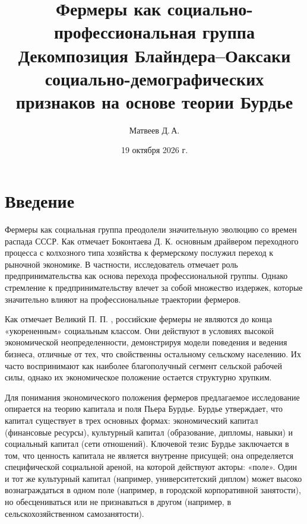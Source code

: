 \documentclass[14pt, a4paper]{article}
\title{\textbf{Фермеры как социально-профессиональная группа}\\[0.35em]
	\large Декомпозиция Блайндера–Оаксаки социально-демографических признаков на основе теории Бурдье}
\author{Матвеев Д.\,А.}
\date{19 октября 2026 г.}
\begin{document}
	\renewcommand{\footnoterule}{}
	\maketitle
	
	
	
	\section{Введение}\label{sec:intro}
	Фермеры как социальная группа преодолели значительную эволюцию со времен распада СССР. Как отмечает Боконтаева Д. К. \cite{bokontaeva1998farmers} основным драйвером переходного процесса с колхозного типа хозяйства к фермерскому послужил переход к рыночной экономике. В частности, исследователь отмечает роль предпринимательства как основа перехода профессиональной группы. Однако стремление к предпринимательству влечет за собой множество издержек, которые значительно влияют на профессиональные траектории фермеров. 
	
	Как отмечает Великий П. П.  \cite{velikiy2024fermerstvo}, российские фермеры не являются до конца «укорененным» социальным классом. Они действуют в условиях высокой экономической неопределенности, демонстрируя модели поведения и ведения бизнеса, отличные от тех, что свойственны остальному сельскому населению. Их часто воспринимают как наиболее благополучный сегмент сельской рабочей силы, однако их экономическое положение остается структурно хрупким.
	
	Для понимания экономического положения фермеров предлагаемое исследование опирается на теорию капитала и поля Пьера Бурдье. Бурдье \cite{bourdieu1986forms} утверждает, что капитал существует в трех основных формах: экономический капитал (финансовые ресурсы), культурный капитал (образование, дипломы, навыки) и социальный капитал (сети отношений). Ключевой тезис Бурдье заключается в том, что ценность капитала не является внутренне присущей; она определяется специфической социальной ареной, на которой действуют акторы: «поле». Один и тот же культурный капитал (например, университетский диплом) может высоко вознаграждаться в одном поле (например, в городской корпоративной занятости), но обесцениваться или не признаваться в другом (например, в сельскохозяйственном самозанятости).
	
\end{document}
